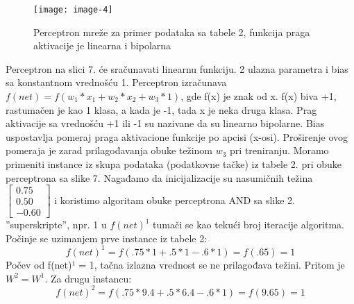 \documentclass[fontsize=11bp, paper=a4]{scrarticle}
\begin{document}
\begin{figure}[h]
    \centering
    \texttt{[image: image-4]}
    \caption{Perceptron mreže za primer podataka sa tabele 2, funkcija praga aktivacije je linearna i bipolarna}
\end{figure}

Perceptron na slici 7. će sračunavati linearnu funkciju. 2 ulazna parametra i bias sa konstantnom vrednošću 1. Perceptron izračunava $f(net) = f(w_1 * x_1 + w_2 * x_2 + w_3 * 1)$, gde f(x) je znak od x. f(x) biva +1, rastumačen je kao 1 klasa, a kada je -1, tada x je neka druga klasa. Prag aktivacije sa vrednošću +1 ili -1 su nazivane da su linearno bipolarne. Bias uspostavlja pomeraj praga aktivacione funkcije po apcisi (x-osi). Proširenje ovog pomeraja je zarad prilagođavanja obuke težinom $w_3$ pri treniranju. Moramo primeniti instance iz skupa podataka (podatkovne tačke) iz tabele 2. pri obuke perceptrona sa slike 7. Nagađamo da inicijalizacije su nasumičnih težina $\begin{bmatrix} 0.75 \\ 0.50 \\ -0.60 \end{bmatrix}$ i koristimo algoritam obuke perceptrona AND sa slike 2. ''superskripte'', npr. 1 u $f(net)^1$ tumači se kao tekući broj iteracije algoritma. Počinje se uzimanjem prve instance iz tabele 2:
$$
f(net) ^ 1 = f(.75* 1 + .5*1 - .6*1) = f(.65) = 1
$$
Počev od f(net)¹ = 1, tačna izlazna vrednost se ne prilagođava težini. Pritom je $W^2=W^1$. Za drugu instancu:
$$
f(net)^2 = f(.75* 9.4 + .5*6.4 - .6*1) = f(9.65) = 1
$$
\end{document}
